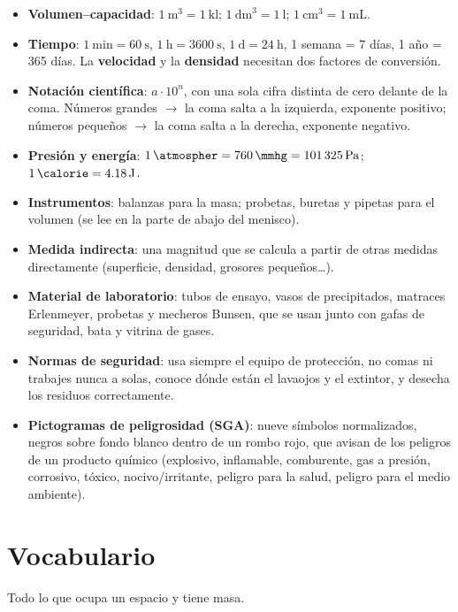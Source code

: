\begin{itemize}
    \item \textbf{Volumen--capacidad}: \(\qty{1}{\cubic\metre} = \qty{1}{\kilo\litre}\); \(\qty{1}{\cubic\dm} = \qty{1}{\litre}\); \(\qty{1}{\cubic\cm} = \qty{1}{\mL}\).
    \item \textbf{Tiempo}: \(\qty{1}{\minute} = \qty{60}{\s}\), \(\qty{1}{\hour} = \qty{3600}{\s}\), \(\qty{1}{\day} = \qty{24}{\hour}\), 1 semana = 7 días, 1 año = 365 días. La \textbf{velocidad} y la \textbf{densidad} necesitan dos factores de conversión.
    \item \textbf{Notación científica}: \(a \cdot 10^{n}\), con una sola cifra distinta de cero delante de la coma. Números grandes \(\to\) la coma salta a la izquierda, exponente positivo; números pequeños \(\to\) la coma salta a la derecha, exponente negativo.
    \item \textbf{Presión y energía}: \(\qty{1}{\atmospher} = \qty{760}{\mmhg} = \qty{101325}{\Pa}\); \(\qty{1}{\calorie} = \qty{4.18}{\J}\).
    \item \textbf{Instrumentos}: balanzas para la masa; probetas, buretas y pipetas para el volumen (se lee en la parte de abajo del menisco).
    \item \textbf{Medida indirecta}: una magnitud que se calcula a partir de otras medidas directamente (superficie, densidad, grosores pequeños\ldots).
    \item \textbf{Material de laboratorio}: tubos de ensayo, vasos de precipitados, matraces Erlenmeyer, probetas y mecheros Bunsen, que se usan junto con gafas de seguridad, bata y vitrina de gases.
    \item \textbf{Normas de seguridad}: usa siempre el equipo de protección, no comas ni trabajes nunca a solas, conoce dónde están el lavaojos y el extintor, y desecha los residuos correctamente.
    \item \textbf{Pictogramas de peligrosidad (SGA)}: nueve símbolos normalizados, negros sobre fondo blanco dentro de un rombo rojo, que avisan de los peligros de un producto químico (explosivo, inflamable, comburente, gas a presión, corrosivo, tóxico, nocivo/irritante, peligro para la salud, peligro para el medio ambiente).
\end{itemize}

\section{Vocabulario}

\begin{vocabulary}
    Todo lo que ocupa un espacio y tiene masa.
\end{vocabulary}

